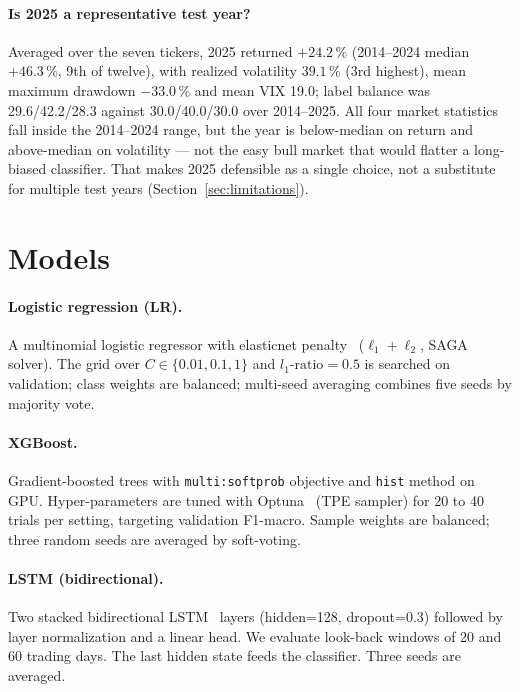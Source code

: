\documentclass[runningheads]{llncs}
\begin{document}
\paragraph{Is 2025 a representative test year?}
Averaged over the seven tickers, 2025 returned $+24.2\,\%$ (2014--2024 median
$+46.3\,\%$, 9th of twelve), with realized volatility $39.1\,\%$ (3rd highest),
mean maximum drawdown $-33.0\,\%$ and mean VIX 19.0; label balance was
29.6/42.2/28.3 against 30.0/40.0/30.0 over 2014--2025. All four market
statistics fall inside the 2014--2024 range, but the year is below-median on
return and above-median on volatility --- not the easy bull market that would
flatter a long-biased classifier. That makes 2025 defensible as a single
choice, not a substitute for multiple test years (Section~\ref{sec:limitations}).

\section{Models}
\label{sec:models}

\paragraph{Logistic regression (LR).}
A multinomial logistic regressor with elasticnet penalty~\cite{zou2005} ($\ell_1+\ell_2$, SAGA solver). The grid over $C \in \{0.01, 0.1, 1\}$ and $l_1\text{-ratio}=0.5$ is searched on validation; class weights are balanced; multi-seed averaging combines five seeds by majority vote.

\paragraph{XGBoost.}
Gradient-boosted trees with \texttt{multi:softprob} objective and \texttt{hist} method on GPU. Hyper-parameters are tuned with Optuna~\cite{akiba2019} (TPE sampler) for 20 to 40 trials per setting, targeting validation F1-macro. Sample weights are balanced; three random seeds are averaged by soft-voting.

\paragraph{LSTM (bidirectional).}
Two stacked bidirectional LSTM~\cite{hochreiter1997} layers (hidden=128, dropout=0.3) followed by layer normalization and a linear head. We evaluate look-back windows of 20 and 60 trading days. The last hidden state feeds the classifier. Three seeds are averaged.
\end{document}

